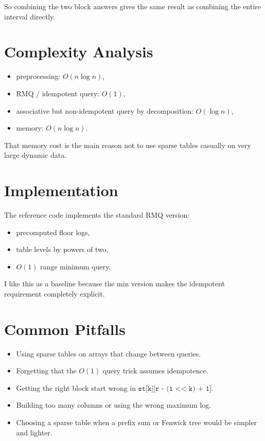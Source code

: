 So combining the two block answers gives the same result as combining the entire interval directly.

\section*{Complexity Analysis}

\begin{itemize}
  \item preprocessing: \(O(n \log n)\),
  \item RMQ / idempotent query: \(O(1)\),
  \item associative but non-idempotent query by decomposition: \(O(\log n)\),
  \item memory: \(O(n \log n)\).
\end{itemize}

That memory cost is the main reason not to use sparse tables casually on very large dynamic data.

\section*{Implementation}

The reference code implements the standard RMQ version:

\begin{itemize}
  \item precomputed floor logs,
  \item table levels by powers of two,
  \item \(O(1)\) range minimum query.
\end{itemize}

I like this as a baseline because the min version makes the idempotent requirement completely explicit.

\section*{Common Pitfalls}

\begin{itemize}
  \item Using sparse tables on arrays that change between queries.
  \item Forgetting that the \(O(1)\) query trick assumes idempotence.
  \item Getting the right block start wrong in \(\texttt{st[k][r - (1 << k) + 1]}\).
  \item Building too many columns or using the wrong maximum log.
  \item Choosing a sparse table when a prefix sum or Fenwick tree would be simpler and lighter.
\end{itemize}


